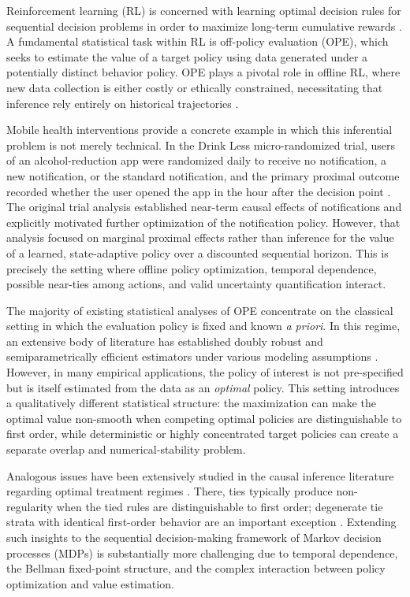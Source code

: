 \documentclass[12pt]{article}
\theoremstyle{remark}\newtheorem{remark}[theorem]{Remark}\theoremstyle{plain}
\begin{document}
Reinforcement learning (RL) is concerned with learning optimal decision rules for sequential decision problems in order to maximize long-term cumulative rewards \citep{sutton2018reinforcement}. 
A fundamental statistical task within RL is off-policy evaluation (OPE), which seeks to estimate the value of a target policy using data generated under a potentially distinct behavior policy. 
OPE plays a pivotal role in offline RL, where new data collection is either costly or ethically constrained, necessitating that inference rely entirely on historical trajectories \citep{luedtke2016statistical,agarwal2019reinforcement,uehara2022review}.

Mobile health interventions provide a concrete example in which this inferential problem is not merely technical.
In the Drink Less micro-randomized trial, users of an alcohol-reduction app were randomized daily to receive no notification, a new notification, or the standard notification, and the primary proximal outcome recorded whether the user opened the app in the hour after the decision point \citep{bell2023notifications}.
The original trial analysis established near-term causal effects of notifications and explicitly motivated further optimization of the notification policy.
However, that analysis focused on marginal proximal effects rather than inference for the value of a learned, state-adaptive policy over a discounted sequential horizon.
This is precisely the setting where offline policy optimization, temporal dependence, possible near-ties among actions, and valid uncertainty quantification interact.

The majority of existing statistical analyses of OPE concentrate on the classical setting in which the evaluation policy is fixed and known \textit{a priori}. 
In this regime, an extensive body of literature has established doubly robust and semiparametrically efficient estimators under various modeling assumptions \citep{jiang2016doubly,kallus2020double,shi2021deeply}. 
However, in many empirical applications, the policy of interest is not pre-specified but is itself estimated from the data as an \emph{optimal} policy. 
This setting introduces a qualitatively different statistical structure:
the maximization can make the optimal value non-smooth when competing
optimal policies are distinguishable to first order, while deterministic
or highly concentrated target policies can create a separate overlap
and numerical-stability problem.

Analogous issues have been extensively studied in the causal inference literature regarding optimal treatment regimes \citep{laber2014dynamic,kosorok2019precision,athey2021policy}.  There, ties typically produce non-regularity when the tied rules are distinguishable to first order; degenerate tie strata with identical first-order behavior are an important exception \citep{luedtke2016statistical}.
Extending such insights to the sequential decision-making framework of Markov decision processes (MDPs) is substantially more challenging due to temporal dependence, the Bellman fixed-point structure, and the complex interaction between policy optimization and value estimation.
\end{document}
